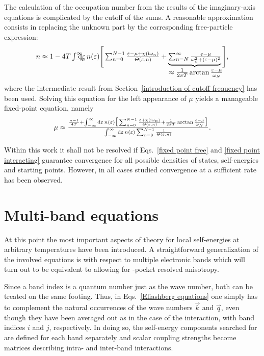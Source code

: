 The calculation of the occupation number from the results of the imaginary-axis
 equations is complicated by the cutoff of the 
sums. A reasonable approximation consists in replacing the unknown part by the
corresponding free-particle expression:
%
\begin{equation*}
    n \approx 1 - 4 T \int \from{-\infty} \till \infty \D \epsilon \,
    n(\epsilon)
    \Bigg[
        \sum_{n = 0}^{N - 1}
        \frac{\epsilon - \mu + \chi(\I \omega_n)}{\Theta(\epsilon, n)}
        + \hypo { \sum_{n = N}^\infty
            \frac{\epsilon - \mu}{\omega_n^2 + (\epsilon - \mu)^2} }
            {\approx \frac 1 {2 \pi T} \arctan \frac{\epsilon - \mu}{\omega_N}}
    \Bigg],
\end{equation*}
%
where the intermediate result from Section~\ref{introduction of cutoff
frequency} has been used. Solving this equation for the left appearance of $\mu$
yields a manageable fixed-point equation, namely
%
\begin{equation} \label{fixed point interacting}
    \mu \approx \frac
    {
        \frac{n - 1}{4 T} + \int_{-\infty}^\infty \D \epsilon \, n(\epsilon)
        \big[
            \sum_{n = 0}^{N - 1}
            \frac{\epsilon + \chi(\I \omega_n)}{\Theta(\epsilon, n)}
            + \frac 1 {2 \pi T} \arctan \frac{\epsilon - \mu}{\omega_N}
        \big]
    }
    {
        \int_{-\infty}^\infty \D \epsilon \, n(\epsilon)
        \sum_{n = 0}^{N - 1} \frac 1 {\Theta(\epsilon, n)}
    }.
\end{equation}

Within this work it shall not be resolved if Eqs.~\ref{fixed point free} and
\ref{fixed point interacting} guarantee convergence for all possible densities
of states, self-energies and starting points. However, in all cases studied
convergence at a sufficient rate has been observed.

\section{Multi-band equations}
\label{multi-band equations}

At this point the most important aspects of  theory for local
self-energies at arbitrary temperatures have been introduced. A straightforward
generalization of the involved equations is with respect to multiple electronic
bands which will turn out to be equivalent to allowing for -pocket
resolved anisotropy.

Since a band index is a quantum number just as the wave number, both can be
treated on the same footing. Thus, in Eqs.~\ref{Eliashberg equations} one simply
has to complement the natural occurrences of the wave numbers $\vec k$ and $\vec
q$, even though they have been averaged out as in the case of the 
interaction, with band indices $i$ and $j$, respectively. In doing so, the
self-energy components searched for are defined for each band separately and
scalar coupling strengths become matrices describing intra- and inter-band
interactions.

